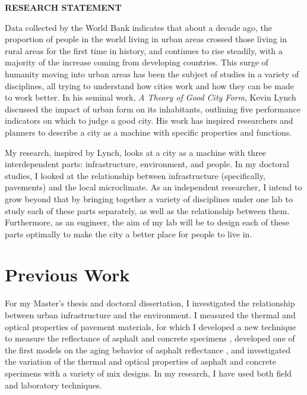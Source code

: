 \documentclass[12pt]{article}
\begin{document}
 \sloppy %

\begin{center}
{\large \uppercase{\textbf{Research Statement}}}
\end{center}

Data collected by the World Bank \cite{Urbanpop19:online} indicates that about a decade ago, the proportion of people in the world living in urban areas crossed those living in rural areas for the first time in history, and continues to rise steadily, with a majority of the increase coming from developing countries. This surge of humanity moving into urban areas has been the subject of studies in a variety of disciplines, all trying to understand how cities work and how they can be made to work better. In his seminal work, \textit{A Theory of Good City Form}, Kevin Lynch \cite{lynch1984good} discussed the impact of urban form on its inhabitants, outlining five performance indicators on which to judge a good city. His work has inspired researchers and planners to describe a city as a machine \cite{molotch1976city, mcfarlane2011city, lloyd2001city, oke1973city} with specific properties and functions.

My research, inspired by Lynch, looks at a city as a machine with three interdependent parts: infrastructure, environment, and people. In my doctoral studies, I looked at the relationship between infrastructure (specifically, pavements) and the local microclimate. As an independent researcher, I intend to grow beyond that by bringing together a variety of disciplines under one lab to study each of these parts separately, as well as the relationship between them. Furthermore, as an engineer, the aim of my lab will be to design each of these parts optimally to make the city a better place for people to live in. 

\section*{Previous Work}
For my Master's thesis and doctoral dissertation, I investigated the relationship between urban infrastructure and the environment. I measured the thermal and optical properties of pavement materials, for which I developed a new technique to measure the reflectance of asphalt and concrete specimens \cite{sen2018albedo}, developed one of the first models on the aging behavior of asphalt reflectance \cite{sen2016aging}, and investigated the variation of the thermal and optical properties of asphalt and concrete specimens with a variety of mix designs. In my research, I have used both field and laboratory techniques.
\end{document}
